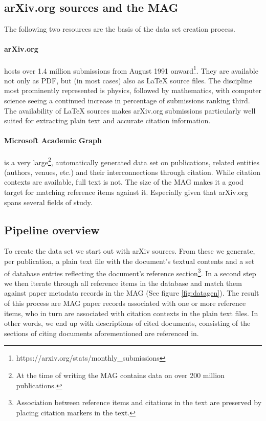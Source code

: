 \subsection{arXiv.org sources and the MAG}
The following two resources are the basis of the data set creation process.

\paragraph{arXiv.org} hosts over 1.4 million submissions from August 1991 onward\footnote{https://arxiv.org/stats/monthly\_submissions}. They are available not only as PDF, but (in most cases) also as LaTeX source files. The discipline most prominently represented is physics, followed by mathematics, with computer science seeing a continued increase in percentage of submissions ranking third. The availability of LaTeX sources makes arXiv.org submissions particularly well suited for extracting plain text and accurate citation information.
\paragraph{Microsoft Academic Graph} is a very large\footnote{At the time of writing the MAG contains data on over 200 million publications.}, automatically generated data set on publications, related entities (authors, venues, etc.) and their interconnections through citation. While citation contexts are available, full text is not. The size of the MAG makes it a good target for matching reference items against it. Especially given that arXiv.org spans several fields of study.
\subsection{Pipeline overview}
To create the data set we start out with arXiv sources. From these we generate, per publication, a plain text file with the document's textual contents and a set of database entries reflecting the document's reference section\footnote{Association between reference items and citations in the text are preserved by placing citation markers in the text.}. In a second step we then iterate through all reference items in the database and match them against paper metadata records in the MAG (See figure \ref{fig:datagen}). The result of this process are MAG paper records associated with one or more reference items, who in turn are associated with citation contexts in the plain text files. In other words, we end up with descriptions of cited documents, consisting of the sections of citing documents aforementioned are referenced in.


